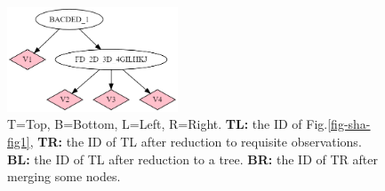 \begin{itemize}
\begin{figure}[h!]
\includegraphics[width=2in]{influ-diag/sha-fig4coarse.png}
\caption{T=Top, B=Bottom, L=Left, R=Right. {\bf TL:} the ID of Fig.\ref{fig-sha-fig1},
{\bf TR:} the ID of TL after reduction to requisite
observations. {\bf BL:} the ID of TL after reduction to a tree.
{\bf BR:} the ID of TR after merging some nodes.}
\label{fig-sha-fig134}
\end{figure}





\end{itemize}